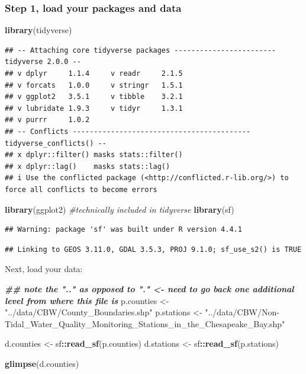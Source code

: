 \documentclass[]{article}
\newenvironment{Shaded}{\begin{snugshade}}{\end{snugshade}}
\newcommand{\CommentTok}[1]{\textcolor[rgb]{0.56,0.35,0.01}{\textit{#1}}}
\newcommand{\DocumentationTok}[1]{\textcolor[rgb]{0.56,0.35,0.01}{\textbf{\textit{#1}}}}
\newcommand{\FunctionTok}[1]{\textcolor[rgb]{0.13,0.29,0.53}{\textbf{#1}}}
\newcommand{\NormalTok}[1]{#1}
\newcommand{\OtherTok}[1]{\textcolor[rgb]{0.56,0.35,0.01}{#1}}
\newcommand{\SpecialCharTok}[1]{\textcolor[rgb]{0.81,0.36,0.00}{\textbf{#1}}}
\newcommand{\StringTok}[1]{\textcolor[rgb]{0.31,0.60,0.02}{#1}}
\begin{document}
\subsubsection{Step 1, load your packages and
data}\label{step-1-load-your-packages-and-data}

\begin{Shaded}
\begin{Highlighting}[]
\FunctionTok{library}\NormalTok{(tidyverse)}
\end{Highlighting}
\end{Shaded}

\begin{verbatim}
## -- Attaching core tidyverse packages ------------------------ tidyverse 2.0.0 --
## v dplyr     1.1.4     v readr     2.1.5
## v forcats   1.0.0     v stringr   1.5.1
## v ggplot2   3.5.1     v tibble    3.2.1
## v lubridate 1.9.3     v tidyr     1.3.1
## v purrr     1.0.2     
## -- Conflicts ------------------------------------------ tidyverse_conflicts() --
## x dplyr::filter() masks stats::filter()
## x dplyr::lag()    masks stats::lag()
## i Use the conflicted package (<http://conflicted.r-lib.org/>) to force all conflicts to become errors
\end{verbatim}

\begin{Shaded}
\begin{Highlighting}[]
\FunctionTok{library}\NormalTok{(ggplot2) }\CommentTok{\#technically included in tidyverse}
\FunctionTok{library}\NormalTok{(sf)}
\end{Highlighting}
\end{Shaded}

\begin{verbatim}
## Warning: package 'sf' was built under R version 4.4.1
\end{verbatim}

\begin{verbatim}
## Linking to GEOS 3.11.0, GDAL 3.5.3, PROJ 9.1.0; sf_use_s2() is TRUE
\end{verbatim}

Next, load your data:

\begin{Shaded}
\begin{Highlighting}[]
\DocumentationTok{\#\# note the ".." as opposed to "." \textless{}{-} need to go back one additional level from where this file is}
\NormalTok{p.counties }\OtherTok{\textless{}{-}} \StringTok{"../data/CBW/County\_Boundaries.shp"}
\NormalTok{p.stations }\OtherTok{\textless{}{-}} \StringTok{"../data/CBW/Non{-}Tidal\_Water\_Quality\_Monitoring\_Stations\_in\_the\_Chesapeake\_Bay.shp"}


\NormalTok{d.counties }\OtherTok{\textless{}{-}}\NormalTok{ sf}\SpecialCharTok{::}\FunctionTok{read\_sf}\NormalTok{(p.counties)}
\NormalTok{d.stations }\OtherTok{\textless{}{-}}\NormalTok{ sf}\SpecialCharTok{::}\FunctionTok{read\_sf}\NormalTok{(p.stations)}

\FunctionTok{glimpse}\NormalTok{(d.counties)}
\end{Highlighting}
\end{Shaded}
\end{document}
